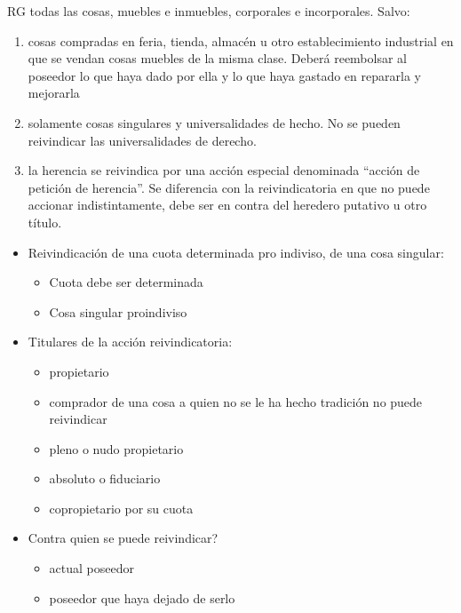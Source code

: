 \documentclass[]{article}
\providecommand{\tightlist}{%
  \setlength{\itemsep}{0pt}\setlength{\parskip}{0pt}}
\begin{document}
\begin{itemize}
\begin{itemize}
    RG todas las cosas, muebles e inmuebles, corporales e incorporales.
    Salvo:

    \begin{enumerate}
    \def\labelenumi{\arabic{enumi}.}
    \tightlist
    \item
      cosas compradas en feria, tienda, almacén u otro establecimiento
      industrial en que se vendan cosas muebles de la misma clase.
      Deberá reembolsar al poseedor lo que haya dado por ella y lo que
      haya gastado en repararla y mejorarla
    \item
      solamente cosas singulares y universalidades de hecho. No se
      pueden reivindicar las universalidades de derecho.
    \item
      la herencia se reivindica por una acción especial denominada
      ``acción de petición de herencia''. Se diferencia con la
      reivindicatoria en que no puede accionar indistintamente, debe ser
      en contra del heredero putativo u otro título.
    \end{enumerate}

    \begin{itemize}
    \tightlist
    \item
      Reivindicación de una cuota determinada pro indiviso, de una cosa
      singular:

      \begin{itemize}
      \tightlist
      \item
        Cuota debe ser determinada
      \item
        Cosa singular proindiviso
      \end{itemize}
    \item
      Titulares de la acción reivindicatoria:

      \begin{itemize}
      \tightlist
      \item
        propietario
      \item
        comprador de una cosa a quien no se le ha hecho tradición no
        puede reivindicar
      \item
        pleno o nudo propietario
      \item
        absoluto o fiduciario
      \item
        copropietario por su cuota
      \end{itemize}
    \item
      Contra quien se puede reivindicar?

      \begin{itemize}
      \tightlist
      \item
        actual poseedor
      \item
        poseedor que haya dejado de serlo


\end{itemize}
\end{itemize}
\end{itemize}
\end{itemize}
\end{document}

